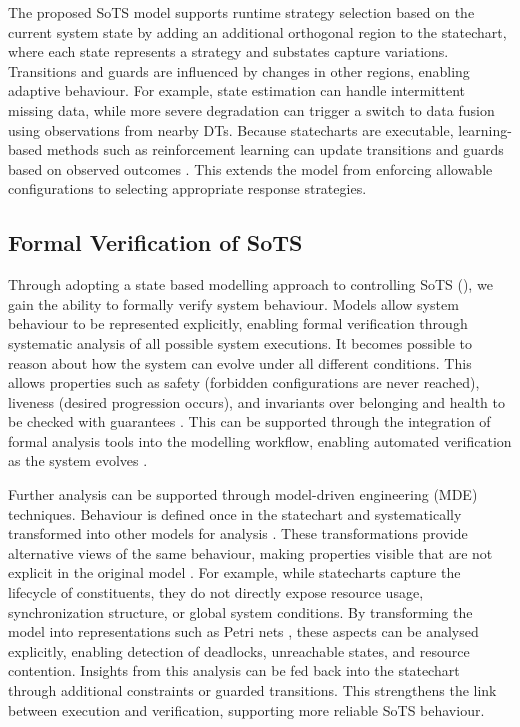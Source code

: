 The proposed SoTS model supports runtime strategy selection based on the current system state by adding an additional orthogonal region to the statechart, where each state represents a strategy and substates capture variations. Transitions and guards are influenced by changes in other regions, enabling adaptive behaviour. For example, state estimation can handle intermittent missing data, while more severe degradation can trigger a switch to data fusion using observations from nearby DTs. Because statecharts are executable, learning-based methods such as reinforcement learning can update transitions and guards based on observed outcomes \cite{zhang2020fault, dong2023deep}. This extends the model from enforcing allowable configurations to selecting appropriate response strategies.


\subsection{Formal Verification of SoTS}
Through adopting a state based modelling approach to controlling SoTS (), we gain the ability to formally verify system behaviour. Models allow system behaviour to be represented explicitly, enabling formal verification through systematic analysis of all possible system executions. It becomes possible to reason about how the system can evolve under all different conditions. This allows properties such as safety (forbidden configurations are never reached), liveness (desired progression occurs), and invariants over belonging and health to be checked with guarantees \cite{henzinger2023quantitative}. This can be supported through the integration of formal analysis tools into the modelling workflow, enabling automated verification as the system evolves \cite{drusinsky2011modeling}.

Further analysis can be supported through model-driven engineering (MDE) techniques. Behaviour is defined once in the statechart and systematically transformed into other models for analysis \cite{biehl2010literature}. These transformations provide alternative views of the same behaviour, making properties visible that are not explicit in the original model \cite{bezivin2006model}. For example, while statecharts capture the lifecycle of constituents, they do not directly expose resource usage, synchronization structure, or global system conditions. By transforming the model into representations such as Petri nets \cite{cortadella1995synthesizing, hei2011automatic}, these aspects can be analysed explicitly, enabling detection of deadlocks, unreachable states, and resource contention. Insights from this analysis can be fed back into the statechart through additional constraints or guarded transitions. This strengthens the link between execution and verification, supporting more reliable SoTS behaviour.

